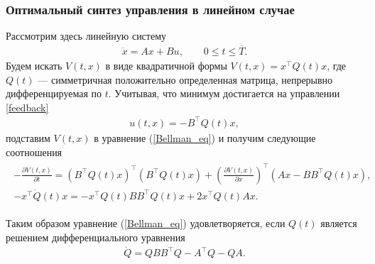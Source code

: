 \documentclass[../main.tex]{subfiles}
\begin{document}
	\subsubsection{Оптимальный синтез управления в линейном случае}
	
	
	Рассмотрим здесь линейную систему
	\begin{gather}\label{linearC}
		\dot{x} =  A  x + B u, \qquad 0 \leqslant t \leqslant \overline{T}.
	\end{gather}
	Будем искать $V(t,x)$ в виде квадратичной формы $V(t,x)=x^\top Q(t)x $, где $Q(t)$ --- симметричная положительно определенная матрица, непрерывно дифференцируемая по $t$. Учитывая, что минимум достигается на управлении \eqref{feedback} 
	\begin{gather}\label{linear_feedback}
		u(t,x) = -B^{\top} Q(t) x,
	\end{gather}
	подставим $V(t,x)$ в уравнение (\ref{Bellman_eq}) и получим следующие соотношения
	\begin{gather*}
		\begin{gathered}
		-\frac{\partial V(t,x)}{\partial t} =  \left( B^{\top} Q(t) x\right) ^{\top} \left( B^{\top} Q(t) x\right)  + \left(\frac{\partial V(t,x)}{\partial x}\right)^{\top} \left(A x - B B^{\top} Q(t) x\right), \\
		-x^{\top} \dot{Q}(t) x =  -x^{\top} Q(t) B B^{\top} Q(t) x  + 2 x^{\top} Q(t) A x.	
		\end{gathered}
	\end{gather*}
	
	Таким образом уравнение (\ref{Bellman_eq}) удовлетворяется, если $Q(t)$ является решением дифференциального уравнения
	\begin{gather}\label{eqQ}
		\dot{Q}  = Q B B^{\top} Q - A^{\top}Q - Q A.
	\end{gather}
	
\end{document}
